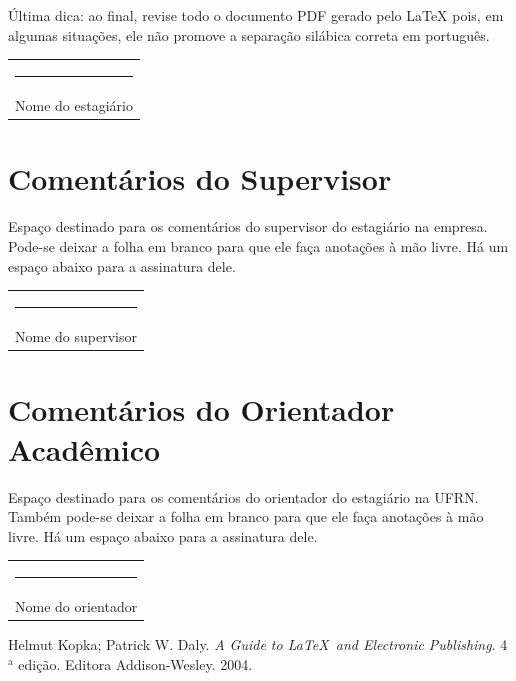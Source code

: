 \documentclass[a4paper, 12pt]{article}
\begin{document}
Última dica: ao final, revise todo o documento PDF gerado pelo {\LaTeX} pois, em algumas situações, ele não promove a separação silábica correta em português.

\vfill

\begin{center}
\begin{tabular}{c}
\rule{10cm}{1pt} \\ 
Nome do estagiário
\end{tabular}
\end{center}

\newpage

\section*{Comentários do Supervisor}

Espaço destinado para os comentários do supervisor do estagiário na empresa. Pode-se deixar a folha em branco para que ele faça anotações à mão livre. Há um espaço abaixo para a assinatura dele.

\vfill

\begin{center}
\begin{tabular}{c}
\rule{10cm}{1pt} \\ 
Nome do supervisor
\end{tabular}
\end{center}

\newpage

\section*{Comentários do Orientador Acadêmico}

Espaço destinado para os comentários do orientador do estagiário na UFRN. Também pode-se deixar a folha em branco para que ele faça anotações à mão livre.  Há um espaço abaixo para a assinatura dele.

\vfill

\begin{center}
\begin{tabular}{c}
\rule{10cm}{1pt} \\ 
Nome do orientador
\end{tabular}
\end{center}

\newpage

\singlespacing

\begin{thebibliography}{99}

 Helmut Kopka; Patrick W. Daly. {\em A Guide to \LaTeX\ and Electronic Publishing}. 4$^\mathrm{a}$ edição. Editora Addison-Wesley. 2004.
\end{thebibliography}
\end{document}
